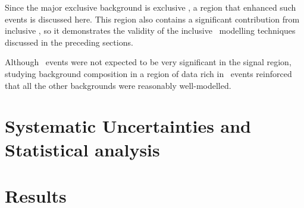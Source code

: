 \par Since the major 
exclusive background is exclusive \WW, a region that enhanced such events is discussed here. 
This region also contains a significant contribution from inclusive \WW, so it demonstrates the 
validity of the inclusive \WW\ modelling techniques discussed in the preceding sections. 

\par Although \Ztau\ events were not expected to be very significant in the signal region, 
studying background composition in a region of data rich in \Ztau\ events reinforced that 
all the other backgrounds were reasonably well-modelled. 



\section{Systematic Uncertainties and Statistical analysis}
\label{sec:exclHUnc}


\section{Results}
\label{sec:exclHres}



%
